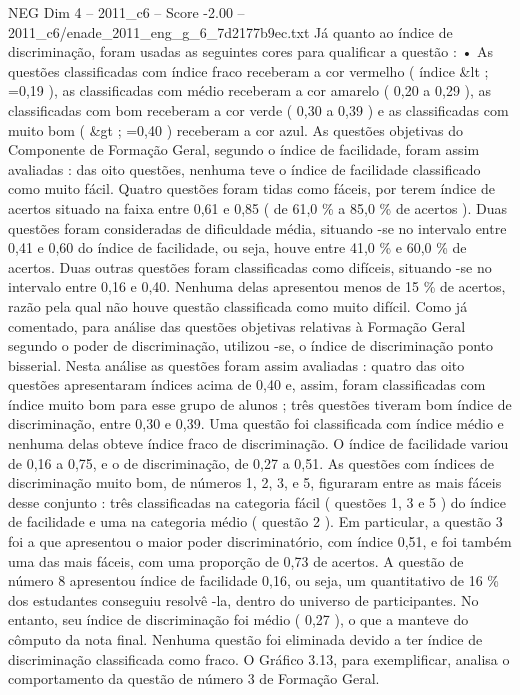 \begin{textsample}{NEG Dim 4 – 2011\_c6 – Score -2.00 – 2011\_c6/enade\_2011\_eng\_g\_6\_7d2177b9ec.txt}
Já quanto ao índice de discriminação, foram usadas as seguintes cores para qualificar a questão : • As questões classificadas com índice fraco receberam a cor vermelho ( índice \&lt ; =0,19 ), as classificadas com médio receberam a cor amarelo ( 0,20 a 0,29 ), as classificadas com bom receberam a cor verde ( 0,30 a 0,39 ) e as classificadas com muito bom ( \&gt ; =0,40 ) receberam a cor azul.
As questões objetivas do Componente de Formação Geral, segundo o índice de facilidade, foram assim avaliadas : das oito questões, nenhuma teve o índice de facilidade classificado como muito fácil.
Quatro questões foram tidas como fáceis, por terem índice de acertos situado na faixa entre 0,61 e 0,85 ( de 61,0 \% a 85,0 \% de acertos ).
Duas questões foram consideradas de dificuldade média, situando -se no intervalo entre 0,41 e 0,60 do índice de facilidade, ou seja, houve entre 41,0 \% e 60,0 \% de acertos.
Duas outras questões foram classificadas como difíceis, situando -se no intervalo entre 0,16 e 0,40.
Nenhuma delas apresentou menos de 15 \% de acertos, razão pela qual não houve questão classificada como muito difícil.
Como já comentado, para análise das questões objetivas relativas à Formação Geral segundo o poder de discriminação, utilizou -se, o índice de discriminação ponto bisserial.
Nesta análise as questões foram assim avaliadas : quatro das oito questões apresentaram índices acima de 0,40 e, assim, foram classificadas com índice muito bom para esse grupo de alunos ; três questões tiveram bom índice de discriminação, entre 0,30 e 0,39.
Uma questão foi classificada com índice médio e nenhuma delas obteve índice fraco de discriminação.
O índice de facilidade variou de 0,16 a 0,75, e o de discriminação, de 0,27 a 0,51.
As questões com índices de discriminação muito bom, de números 1, 2, 3, e 5, figuraram entre as mais fáceis desse conjunto : três classificadas na categoria fácil ( questões 1, 3 e 5 ) do índice de facilidade e uma na categoria médio ( questão 2 ).
Em particular, a questão 3 foi a que apresentou o maior poder discriminatório, com índice 0,51, e foi também uma das mais fáceis, com uma proporção de 0,73 de acertos.
A questão de número 8 apresentou índice de facilidade 0,16, ou seja, um quantitativo de 16 \% dos estudantes conseguiu resolvê -la, dentro do universo de participantes.
No entanto, seu índice de discriminação foi médio ( 0,27 ), o que a manteve do cômputo da nota final.
Nenhuma questão foi eliminada devido a ter índice de discriminação classificada como fraco.
O Gráfico 3.13, para exemplificar, analisa o comportamento da questão de número 3 de Formação Geral.

\end{textsample}

